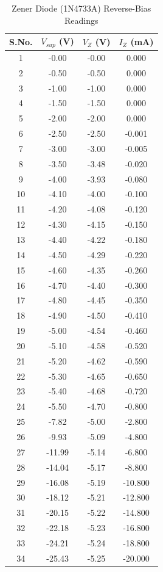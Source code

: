 \documentclass[11pt,a4paper]{article}
\begin{document}
\begin{longtable}{c c c c}
\caption{Zener Diode (1N4733A) Reverse-Bias Readings}\label{tab:zener_reverse_readings}\\
\toprule
\textbf{S.No.} & $V_{sup}$ (V) & $V_Z$ (V) & $I_Z$ (mA) \\
\midrule
1 & -0.00 & -0.00 & 0.000\\
2 & -0.50 & -0.50 & 0.000\\
3 & -1.00 & -1.00 & 0.000\\
4 & -1.50 & -1.50 & 0.000\\
5 & -2.00 & -2.00 & 0.000\\
6 & -2.50 & -2.50 & -0.001\\
7 & -3.00 & -3.00 & -0.005\\
8 & -3.50 & -3.48 & -0.020\\
9 & -4.00 & -3.93 & -0.080\\
10 & -4.10 & -4.00 & -0.100\\
11 & -4.20 & -4.08 & -0.120\\
12 & -4.30 & -4.15 & -0.150\\
13 & -4.40 & -4.22 & -0.180\\
14 & -4.50 & -4.29 & -0.220\\
15 & -4.60 & -4.35 & -0.260\\
16 & -4.70 & -4.40 & -0.300\\
17 & -4.80 & -4.45 & -0.350\\
18 & -4.90 & -4.50 & -0.410\\
19 & -5.00 & -4.54 & -0.460\\
20 & -5.10 & -4.58 & -0.520\\
21 & -5.20 & -4.62 & -0.590\\
22 & -5.30 & -4.65 & -0.650\\
23 & -5.40 & -4.68 & -0.720\\
24 & -5.50 & -4.70 & -0.800\\
25 & -7.82 & -5.00 & -2.800\\
26 & -9.93 & -5.09 & -4.800\\
27 & -11.99 & -5.14 & -6.800\\
28 & -14.04 & -5.17 & -8.800\\
29 & -16.08 & -5.19 & -10.800\\
30 & -18.12 & -5.21 & -12.800\\
31 & -20.15 & -5.22 & -14.800\\
32 & -22.18 & -5.23 & -16.800\\
33 & -24.21 & -5.24 & -18.800\\
34 & -25.43 & -5.25 & -20.000\\
\bottomrule
\end{longtable}
\end{document}
